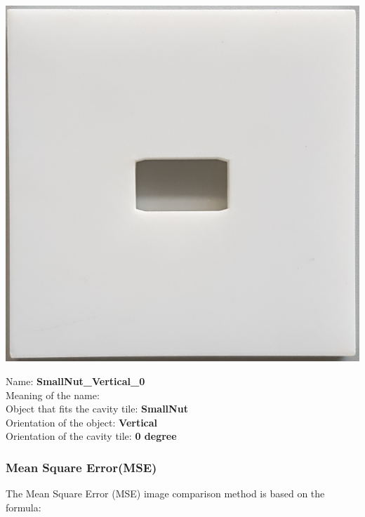 \documentclass{article}
\begin{document}
\begin{minipage}[b]{0.35\linewidth}

\begin{center}
\includegraphics[height=5\baselineskip]{images/SmallNut_Vertical_00.jpg}
\end{center}

\end{minipage}
\begin{minipage}[b]{0.65\linewidth}
\begin{flushleft}
Name: \textbf{SmallNut\_Vertical\_0} \\ 
Meaning of the name: \\ 
Object that fits the cavity tile: \textbf{SmallNut} \\
Orientation of the object: \textbf{Vertical} \\
Orientation of the cavity tile:\textbf{ 0 degree}
\end{flushleft}

\end{minipage}



\subsubsection*{Mean Square Error(MSE)}
 The Mean Square Error (MSE) image comparison method is based on the formula: \\
 
\end{document}
